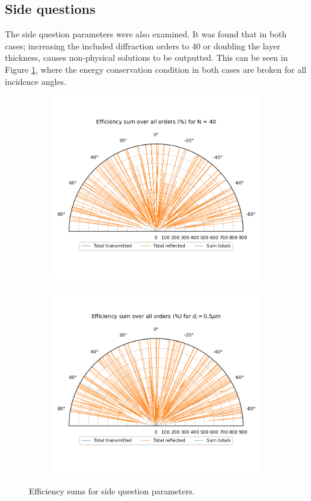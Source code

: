 \documentclass[a4paper,12pt]{scrartcl}
\begin{document}
\subsection{Side questions}
The side question parameters were also examined. It was found that in both cases; increasing the included diffraction orders to 40 or doubling the layer thickness, causes non-physical solutions to be outputted. This can be seen in Figure \ref{fig:effic sum side}, where the energy conservation condition in both cases are broken for all incidence angles. 
\begin{figure}
    \centering
    \begin{subfigure}[b]{0.46\textwidth}
        \includegraphics[width=\textwidth]{figures/sum_effic_N40.png}
    \end{subfigure}
    \begin{subfigure}[b]{0.46\textwidth}
        \includegraphics[width=\textwidth]{figures/sum_effic_d05.png}
    \end{subfigure}
    \caption{Efficiency sums for side question parameters.}
    \label{fig:effic sum side}
\end{figure}
\end{document}
